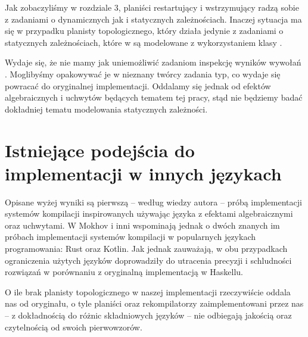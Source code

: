 Jak zobaczyliśmy w rozdziale 3, planiści restartujący i wstrzymujący radzą sobie z zadaniami o dynamicznych jak i statycznych zależnościach. Inaczej sytuacja ma się w przypadku planisty topologicznego, który działa jedynie z zadaniami o statycznych zależnościach, które w \BSaLC{} są modelowane z wykorzystaniem klasy .

Wydaje się, że nie mamy jak uniemożliwić zadaniom inspekcję wyników wywołań . Moglibyśmy opakowywać je w nieznany twórcy zadania typ, co wydaje się powracać do oryginalnej implementacji. Oddalamy się jednak od efektów algebraicznych i uchwytów będących tematem tej pracy, stąd nie będziemy badać dokładniej tematu modelowania statycznych zależności.

\section{Istniejące podejścia do implementacji w innych językach}

Opisane wyżej wyniki są pierwszą -- według wiedzy autora -- próbą implementacji systemów kompilacji inspirowanych \BSaLC{} używając języka z efektami algebraicznymi oraz uchwytami. W \BSaLCTP{} Mokhov i inni wspominają jednak o dwóch znanych im próbach implementacji systemów kompilacji w popularnych językach programowania: Rust\cite{translation_rust} oraz Kotlin\cite{translation_kotlin}. Jak jednak zauważają, w obu przypadkach ograniczenia użytych języków doprowadziły do utracenia precyzji i schludności rozwiązań w porównaniu z oryginalną implementacją w Haskellu.

O ile brak planisty topologicznego w naszej implementacji rzeczywiście oddala nas od oryginału, o tyle planiści oraz rekompilatorzy zaimplementowani przez nas -- z dokładnością do różnic składniowych języków -- nie odbiegają jakością oraz czytelnością od swoich pierwowzorów.
